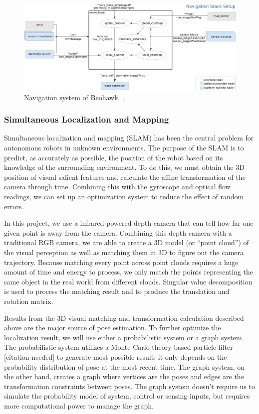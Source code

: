 \documentclass[12pt, letterpaper]{article}
\begin{document}
\begin{figure}[h]
\centering
\includegraphics[width=12cm]{images/overview_tf.png}
\caption{Navigation system of Beohawk. .} 
\label{fig:navi}
\end{figure}

\subsubsection{Simultaneous Localization and Mapping}

Simultaneous localization and mapping (SLAM) has been the central problem for autonomous robots in unknown environments. The purpose of the SLAM is to predict, as accurately as possible, the position of the robot based on its knowledge of the surrounding environment.  To do this, we must obtain the 3D position of visual salient features and calculate the affine transformation of the camera through time. Combining this with the gyroscope and optical flow readings, we can set up an optimization system to reduce the effect of random errors.

In this project, we use a infrared-powered depth camera that can tell how far one given point is away from the camera. Combining this depth camera with a traditional RGB camera, we are able to create a 3D model (or ``point cloud'') of the visual perception as well as matching them in 3D to figure out the camera trajectory. Because matching every point across point clouds requires a huge amount of time and energy to process, we only match the points representing the same object in the real world from different clouds. Singular value decomposition is used to process the matching result and to produce the translation and rotation matrix.

Results from the 3D visual matching and transformation calculation described above are the major source of pose estimation. To further optimize the localization result, we will use either a probabilistic system or a graph system. The probabilistic system utilizes a Monte-Carlo theory based particle filter [citation needed] to generate most possible result; it only depends on the probability distribution of pose at the most recent time. The graph system, on the other hand, creates a graph where vertices are the poses and edges are the transformation constraints between poses. The graph system doesn't require us to simulate the probability model of system, control or sensing inputs, but requires more computational power to manage the graph.
\end{document}
